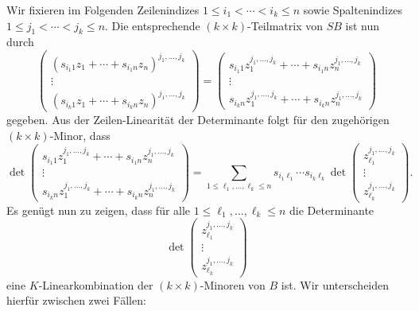Wir fixieren im Folgenden Zeilenindizes $1 \leq i_1 < \dotsb < i_k \leq n$ sowie Spaltenindizes $1 \leq j_1 < \dotsb < j_k \leq n$.
Die entsprechende $(k \times k)$-Teilmatrix von $SB$ ist nun durch
\[
    \begin{pmatrix}
      (s_{i_1 1} z_1 + \dotsb + s_{i_1 n} z_n)^{j_1, \dotsc, j_k} \\
      \vdots                                                      \\
      (s_{i_k 1} z_1 + \dotsb + s_{i_k n} z_n)^{j_1, \dotsc, j_k}
    \end{pmatrix}
  = \begin{pmatrix}
      s_{i_1 1} z_1^{j_1, \dotsc, j_k} + \dotsb + s_{i_1 n} z_n^{j_1, \dotsc, j_k}  \\
      \vdots                                                                        \\
      s_{i_k n} z_1^{j_1, \dotsc, j_k} + \dotsb + s_{i_k n} z_n^{j_1, \dotsc, j_k}
    \end{pmatrix}
\]
gegeben.
Aus der Zeilen-Linearität der Determinante folgt für den zugehörigen $(k \times k)$-Minor, dass
\[
    \det
    \begin{pmatrix}
      s_{i_1 1} z_1^{j_1, \dotsc, j_k} + \dotsb + s_{i_1 n} z_n^{j_1, \dotsc, j_k}  \\
      \vdots                                                                        \\
      s_{i_k n} z_1^{j_1, \dotsc, j_k} + \dotsb + s_{i_k n} z_n^{j_1, \dotsc, j_k}
    \end{pmatrix}
  = \sum_{1 \leq \ell_1, \dotsc, \ell_k \leq n}
    s_{i_1 \ell_1} \dotsm s_{i_k \ell_k}
    \det
    \begin{pmatrix}
      z_{\ell_1}^{j_1, \dotsc, j_k} \\
      \vdots                        \\
      z_{\ell_k}^{j_1, \dotsc, j_k}
    \end{pmatrix}.
\]
Es genügt nun zu zeigen, dass für alle $1 \leq \ell_1, \dotsc, \ell_k \leq n$ die Determinante
\[
    \det
    \begin{pmatrix}
      z_{\ell_1}^{j_1, \dotsc, j_k} \\
      \vdots                        \\
      z_{\ell_k}^{j_1, \dotsc, j_k}
    \end{pmatrix}
\]
eine $K$-Linearkombination der $(k \times k)$-Minoren von $B$ ist.
Wir unterscheiden hierfür zwischen zwei Fällen:
